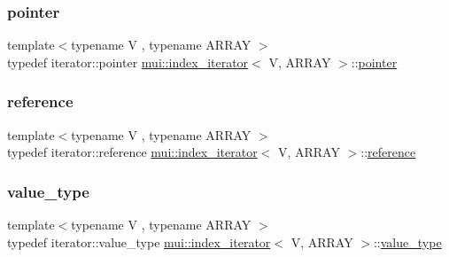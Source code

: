 \mbox{\label{structmui_1_1index__iterator_afbdc05d0a9403f2fb4002373c06dce97}} 
\subsubsection{\texorpdfstring{pointer}{pointer}}
{\footnotesize\ttfamily template$<$typename V , typename A\+R\+R\+AY $>$ \\
typedef iterator\+::pointer \hyperlink{structmui_1_1index__iterator}{mui\+::index\+\_\+iterator}$<$ V, A\+R\+R\+AY $>$\+::\hyperlink{structmui_1_1index__iterator_afbdc05d0a9403f2fb4002373c06dce97}{pointer}}

\mbox{\label{structmui_1_1index__iterator_a3854dd112d5ca1a649babb0357e02394}} 
\subsubsection{\texorpdfstring{reference}{reference}}
{\footnotesize\ttfamily template$<$typename V , typename A\+R\+R\+AY $>$ \\
typedef iterator\+::reference \hyperlink{structmui_1_1index__iterator}{mui\+::index\+\_\+iterator}$<$ V, A\+R\+R\+AY $>$\+::\hyperlink{structmui_1_1index__iterator_a3854dd112d5ca1a649babb0357e02394}{reference}}

\mbox{\label{structmui_1_1index__iterator_a795af944e7eb34f4842a7f5d138fe186}} 
\subsubsection{\texorpdfstring{value\+\_\+type}{value\_type}}
{\footnotesize\ttfamily template$<$typename V , typename A\+R\+R\+AY $>$ \\
typedef iterator\+::value\+\_\+type \hyperlink{structmui_1_1index__iterator}{mui\+::index\+\_\+iterator}$<$ V, A\+R\+R\+AY $>$\+::\hyperlink{structmui_1_1index__iterator_a795af944e7eb34f4842a7f5d138fe186}{value\+\_\+type}}



